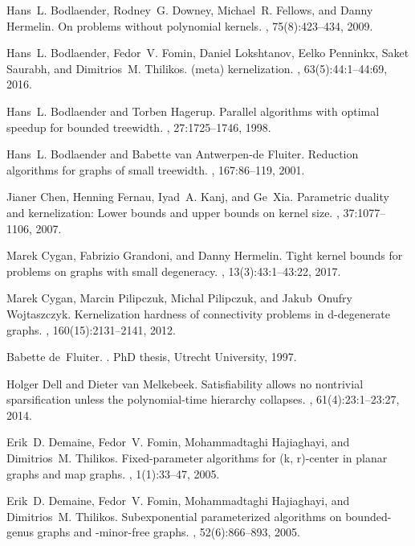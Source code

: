 \documentclass[11pt]{article}
\begin{document}
\begin{thebibliography}{10}
Hans~L. Bodlaender, Rodney~G. Downey, Michael~R. Fellows, and Danny Hermelin.
\newblock On problems without polynomial kernels.
, 75(8):423--434, 2009.

Hans~L. Bodlaender, Fedor~V. Fomin, Daniel Lokshtanov, Eelko Penninkx, Saket
  Saurabh, and Dimitrios~M. Thilikos.
\newblock (meta) kernelization.
, 63(5):44:1--44:69, 2016.

Hans~L. Bodlaender and Torben Hagerup.
\newblock Parallel algorithms with optimal speedup for bounded treewidth.
, 27:1725--1746, 1998.

Hans~L. Bodlaender and Babette van Antwerpen-de Fluiter.
\newblock Reduction algorithms for graphs of small treewidth.
, 167:86--119, 2001.

Jianer Chen, Henning Fernau, Iyad~A. Kanj, and Ge~Xia.
\newblock Parametric duality and kernelization: Lower bounds and upper bounds
  on kernel size.
, 37:1077--1106, 2007.

Marek Cygan, Fabrizio Grandoni, and Danny Hermelin.
\newblock Tight kernel bounds for problems on graphs with small degeneracy.
, 13(3):43:1--43:22, 2017.

Marek Cygan, Marcin Pilipczuk, Michal Pilipczuk, and Jakub~Onufry Wojtaszczyk.
\newblock Kernelization hardness of connectivity problems in d-degenerate
  graphs.
, 160(15):2131--2141, 2012.

Babette de~Fluiter.
.
\newblock PhD thesis, Utrecht University, 1997.

Holger Dell and Dieter van Melkebeek.
\newblock Satisfiability allows no nontrivial sparsification unless the
  polynomial-time hierarchy collapses.
, 61(4):23:1--23:27, 2014.

Erik~D. Demaine, Fedor~V. Fomin, Mohammadtaghi Hajiaghayi, and Dimitrios~M.
  Thilikos.
\newblock Fixed-parameter algorithms for (k, r)-center in planar graphs and map
  graphs.
, 1(1):33--47, 2005.

Erik~D. Demaine, Fedor~V. Fomin, Mohammadtaghi Hajiaghayi, and Dimitrios~M.
  Thilikos.
\newblock Subexponential parameterized algorithms on bounded-genus graphs and
  {}-minor-free graphs.
, 52(6):866--893, 2005.


\end{thebibliography}
\end{document}
